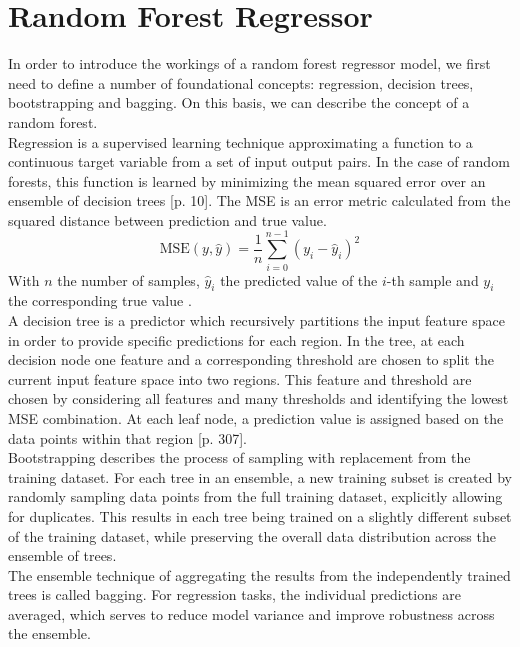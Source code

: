 \section{Random Forest Regressor}

In order to introduce the workings of a random forest regressor model, we first need to define a number of foundational concepts: regression, decision trees, bootstrapping and bagging. On this basis, we can describe the concept of a random forest. \\
Regression is a supervised learning technique approximating a function to a continuous target variable from a set of input output pairs. In the case of random forests, this function is learned by minimizing the mean squared error over an ensemble of decision trees \citep{hastie_elements_2009}[p. 10]. The MSE is an error metric calculated from the squared distance between prediction and true value.
\begin{equation}
    \text{MSE}(y,\hat{y}) = \frac{1}{n} \sum_{i=0}^{n-1} (y_i - \hat{y}_i)^2
    \label{eq:mse}
\end{equation}
With $n$ the number of samples, $\hat{y}_i$ the predicted value of the $i$-th sample and $y_i$ the corresponding true value \cite{noauthor_34_nodate}. \\
A decision tree is a predictor which recursively partitions the input feature space in order to provide specific predictions for each region. In the tree, at each decision node one feature and a corresponding threshold are chosen to split the current input feature space into two regions. This feature and threshold are chosen by considering all features and many thresholds and identifying the lowest MSE combination. At each leaf node, a prediction value is assigned based on the data points within that region \citep{hastie_elements_2009}[p. 307]. \\
Bootstrapping describes the process of sampling with replacement from the training dataset. For each tree in an ensemble, a new training subset is created by randomly sampling data points from the full training dataset, explicitly allowing for duplicates. This results in each tree being trained on a slightly different subset of the training dataset, while preserving the overall data distribution across the ensemble of trees. \\
The ensemble technique of aggregating the results from the independently trained trees is called bagging. For regression tasks, the individual predictions are averaged, which serves to reduce model variance and improve robustness across the ensemble. \\
